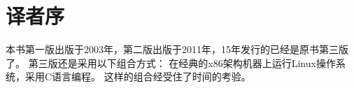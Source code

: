 \chapter{译者序}
{
    本书第一版出版于2003年，第二版出版于2011年，15年发行的已经是原书第三版了。
    第三版还是采用以下组合方式：
    在经典的x86架构机器上运行Linux操作系统，采用C语言编程。
    这样的组合经受住了时间的考验。
}

\cleardoublepage

\endinput
